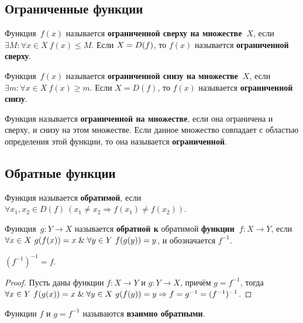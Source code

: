 \subsection{Ограниченные функции}
 Функция~$f(x)$ называется \textbf{ограниченной сверху на множестве~$X$}, если $\exists M \colon \forall x \in X \ f(x) \leqslant M$.
Если $X \opbr= D(f)$, то $f(x)$ называется \textbf{ограниченной сверху}.

Функция~$f(x)$ называется \textbf{ограниченной снизу на множестве~$X$}, если $\exists m \colon \forall x \in X \ f(x) \geqslant m$.
Если $X = D(f)$, то $f(x)$ называется \textbf{ограниченной снизу}.

Функция называется \textbf{ограниченной на множестве}, если она ограничена и сверху, и снизу на этом множестве.
Если данное множество совпадает с областью определения этой функции, то она называется \textbf{ограниченной}.

\subsection{Обратные функции}
 Функция называется \textbf{обратимой}, если $\forall x_1, x_2 \in D(f) \ (x_1 \neq x_2 \Rightarrow f(x_1) \neq f(x_2))$.

 Функция~$g \colon Y \to X$ называется \textbf{обратной к} обратимой \textbf{функции~$f \colon X \to Y$}, если $\forall x \in X \ g(f(x)) = x \opbr\lAnd \forall y \in Y \ f(g(y)) = y$, и обозначается $f^{-1}$.

\begin{statement}
$(f^{-1})^{-1} = f$.
\end{statement}
\begin{proof}
Пусть даны функции $f \colon X \to Y$ и $g \colon Y \to X$, причём $g = f^{-1}$, тогда
$\forall x \in Y \ f(g(x)) = x \opbr\lAnd \forall y \in X \ g(f(y)) = y \Rightarrow f = g^{-1} = (f^{-1})^{-1}$.
\end{proof}

Функции $f$ и $g = f^{-1}$ называются \textbf{взаимно обратными}.

